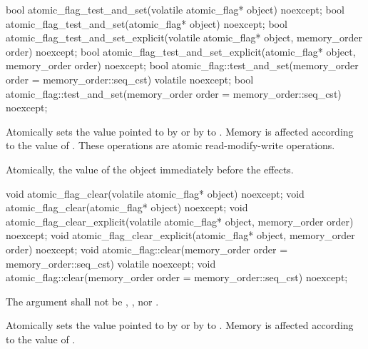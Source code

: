 %
%
%
\begin{itemdecl}
bool atomic_flag_test_and_set(volatile atomic_flag* object) noexcept;
bool atomic_flag_test_and_set(atomic_flag* object) noexcept;
bool atomic_flag_test_and_set_explicit(volatile atomic_flag* object, memory_order order) noexcept;
bool atomic_flag_test_and_set_explicit(atomic_flag* object, memory_order order) noexcept;
bool atomic_flag::test_and_set(memory_order order = memory_order::seq_cst) volatile noexcept;
bool atomic_flag::test_and_set(memory_order order = memory_order::seq_cst) noexcept;
\end{itemdecl}

\begin{itemdescr}
\pnum
\effects Atomically sets the value pointed to by  or by  to . Memory is affected according to the value of
. These operations are atomic read-modify-write operations.

\pnum
\returns Atomically, the value of the object immediately before the effects.
\end{itemdescr}

%
%
%
\begin{itemdecl}
void atomic_flag_clear(volatile atomic_flag* object) noexcept;
void atomic_flag_clear(atomic_flag* object) noexcept;
void atomic_flag_clear_explicit(volatile atomic_flag* object, memory_order order) noexcept;
void atomic_flag_clear_explicit(atomic_flag* object, memory_order order) noexcept;
void atomic_flag::clear(memory_order order = memory_order::seq_cst) volatile noexcept;
void atomic_flag::clear(memory_order order = memory_order::seq_cst) noexcept;
\end{itemdecl}

\begin{itemdescr}
\pnum
\requires The  argument shall not be ,
, nor .

\pnum
\effects Atomically sets the value pointed to by  or by  to
. Memory is affected according to the value of .
\end{itemdescr}


